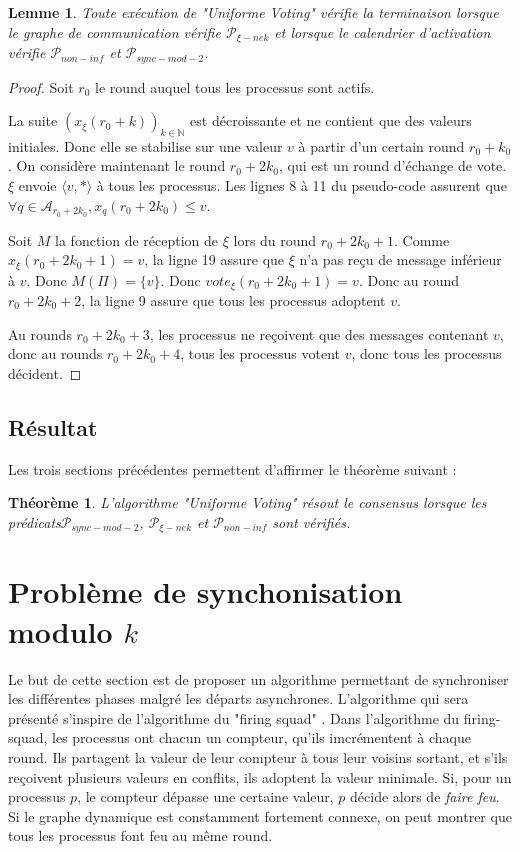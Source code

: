\documentclass{article}
\newtheorem{lemma}{Lemme}
\newtheorem{theorem}{Théorème}
\begin{document}
	\begin{lemma}
		Toute exécution de "Uniforme Voting" vérifie la terminaison lorsque le graphe de communication vérifie $\mathcal{P}_{\xi-nek}$
		et lorsque le calendrier d'activation vérifie $\mathcal{P}_{non-inf}$ et $\mathcal{P}_{sync-mod-2}$.
	\end{lemma}
	\begin{proof}
		Soit $r_0$ le round auquel tous les processus sont actifs.

		La suite $(x_\xi(r_0+k))_{k \in \mathds{N}}$ est décroissante et ne contient que des valeurs initiales. Donc elle se stabilise sur une valeur $v$ à partir d'un certain round $r_0+k_0$.
		On considère maintenant le round $r_0+2k_0$, qui est un round d'échange de vote.
		$\xi$ envoie $\langle v, * \rangle$ à tous les processus. Les lignes 8 à 11 du pseudo-code assurent que $\forall q \in \mathcal{A}_{r_0+2k_0}, x_q(r_0+2k_0) \leq v$.

		Soit $M$ la fonction de réception de $\xi$ lors du round $r_0+2k_0+1$.
		Comme $x_\xi(r_0+2k_0+1) = v$, la ligne 19 assure que $\xi$ n'a pas reçu de message inférieur à $v$.
		Donc $M(\Pi) = \{v\}$. Donc $vote_\xi(r_0+2k_0+1) = v$. Donc au round $r_0+2k_0+2$, la ligne 9 assure que tous les processus adoptent $v$.

		Au rounds $r_0+2k_0+3$, les processus ne reçoivent que des messages contenant $v$, donc au rounds $r_0+2k_0+4$, tous les processus votent $v$, donc tous les processus décident.
	\end{proof}
\subsection{Résultat}

Les trois sections précédentes permettent d'affirmer le théorème suivant :

\begin{theorem}
	L'algorithme "Uniforme Voting" résout le consensus lorsque les prédicats$\mathcal{P}_{sync-mod-2}$, $\mathcal{P}_{\xi-nek}$ et $\mathcal{P}_{non-inf}$ sont vérifiés.
\end{theorem}

\section{Problème de synchonisation modulo $k$}

Le but de cette section est de proposer un algorithme permettant de synchroniser les différentes phases malgré les départs asynchrones.
L'algorithme qui sera présenté s'inspire de l'algorithme du "firing squad" \cite{firing_squad}.
Dans l'algorithme du firing-squad, les processus ont chacun un compteur, qu'ils imcrémentent à chaque round. Ils partagent la valeur de leur compteur à tous leur voisins sortant, 
et s'ils reçoivent plusieurs valeurs en conflits, ils adoptent la valeur minimale.
Si, pour un processus $p$, le compteur dépasse une certaine valeur, $p$ décide alors de \emph{faire feu}.
Si le graphe dynamique est constamment fortement connexe, on peut montrer que tous les processus font feu au même round.
\end{document}
